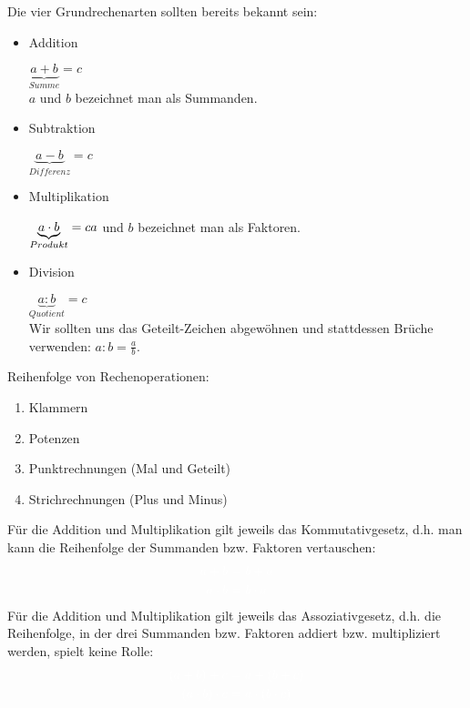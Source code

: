 Die vier Grundrechenarten sollten bereits bekannt sein:
\begin{tcolorbox}
	\begin{itemize}
		\item Addition

		\textcolor{loestc}{\(\underbrace{a+b}_{Summe}=c\)\\\(a\) und \(b\) bezeichnet man als Summanden.}

		\item Subtraktion

		\textcolor{loestc}{\(\underbrace{a-b}_{Differenz}=c\)}

		\item Multiplikation

		\textcolor{loestc}{\(\underbrace{a\cdot b}_{Produkt}=c$\\\(a\) und \(b\) bezeichnet man als Faktoren.}

		\item Division

		\textcolor{loestc}{\(\underbrace{a:b}_{Quotient}=c\)\\Wir sollten uns das Geteilt-Zeichen abgewöhnen und stattdessen Brüche verwenden: \(a:b=\frac{a}{b}\).}
	\end{itemize}
\end{tcolorbox}
Reihenfolge von Rechenoperationen:
\begin{enumerate}
	\item \textcolor{loes}{Klammern}
	\item \textcolor{loes}{Potenzen}
	\item \textcolor{loes}{Punktrechnungen (Mal und Geteilt)}
	\item \textcolor{loes}{Strichrechnungen (Plus und Minus)}
\end{enumerate}
Für die Addition und Multiplikation gilt jeweils das Kommutativgesetz, d.h. man kann die Reihenfolge der Summanden bzw. Faktoren vertauschen:
\begin{align*}
	\textcolor{loes}{a+b\ }&\textcolor{loes}{=b+a}\\
	\textcolor{loes}{a\cdot b\ }&\textcolor{loes}{=b\cdot a}
\end{align*}
Für die Addition und Multiplikation gilt jeweils das Assoziativgesetz, d.h. die Reihenfolge, in der drei Summanden bzw. Faktoren addiert bzw. multipliziert werden, spielt keine Rolle:
\begin{align*}
	\textcolor{loes}{\left( a+b\right) +c\ }&\textcolor{loes}{=a+\left( b+c\right) }\\
	\textcolor{loes}{\left( a\cdot b\right) \cdot c\ }&\textcolor{loes}{=a\cdot\left( b\cdot c\right) }
\end{align*}
